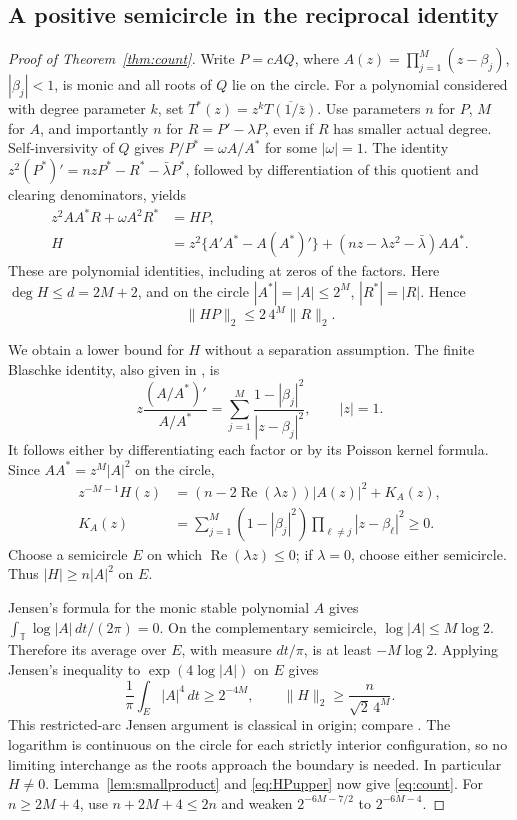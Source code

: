 \documentclass[11pt]{article}
\theoremstyle{remark}\newtheorem{remark}[theorem]{Remark}
\newcommand{\norm}[1]{\lVert #1\rVert}
\newcommand{\Rea}{\operatorname{Re}}
\begin{document}
\subsection{A positive semicircle in the reciprocal identity}
\begin{proof}[Proof of Theorem~\ref{thm:count}]
Write \(P=cAQ\), where
\(A(z)=\prod_{j=1}^M(z-\beta_j)\), \(|\beta_j|<1\), is monic
and all roots of \(Q\) lie on the circle. For a polynomial considered
with degree parameter \(k\), set
\(T^*(z)=z^k\overline{T(1/\bar z)}\).
Use parameters \(n\) for \(P\), \(M\) for \(A\), and importantly
\(n\) for \(R=P'-\lambda P\), even if \(R\) has smaller actual degree.
Self-inversivity of \(Q\) gives
\(P/P^*=\omega A/A^*\) for some \(|\omega|=1\).
The identity
\(z^2(P^*)'=nzP^*-R^*-\bar\lambda P^*\), followed by
differentiation of this quotient and clearing denominators, yields
\begin{align}
 z^2AA^*R+\omega A^2R^*&=HP,\label{eq:reciprocalH}\\
 H&=z^2\{A'A^*-A(A^*)'\}
       +(nz-\lambda z^2-\bar\lambda)AA^* .\label{eq:Hdef}
\end{align}
These are polynomial identities, including at zeros of the factors.
Here \(\deg H\le d=2M+2\), and on the circle
\(|A^*|=|A|\le2^M\), \(|R^*|=|R|\). Hence
\begin{equation}\label{eq:HPupper}
 \norm{HP}_2\le2\,4^M\norm R_2.
\end{equation}

We obtain a lower bound for \(H\) without a separation assumption.
The finite Blaschke identity, also given in
\cite[Lemma 4.3]{kovalev}, is
\[
 z\frac{(A/A^*)'}{A/A^*}
       =\sum_{j=1}^M\frac{1-|\beta_j|^2}{|z-\beta_j|^2},
       \qquad |z|=1.
\]
It follows either by differentiating each factor or by its Poisson
kernel formula. Since \(AA^*=z^M|A|^2\) on the circle,
\begin{align}
 z^{-M-1}H(z)&=(n-2\Rea(\lambda z))|A(z)|^2+K_A(z),\label{eq:positiveH}\\
 K_A(z)&=\sum_{j=1}^M(1-|\beta_j|^2)
                    \prod_{\ell\ne j}|z-\beta_\ell|^2\ge0.\nonumber
\end{align}
Choose a semicircle \(E\) on which \(\Rea(\lambda z)\le0\);
if \(\lambda=0\), choose either semicircle. Thus \(|H|\ge n|A|^2\)
on \(E\).

Jensen's formula for the monic stable polynomial \(A\) gives
\(\int_{\mathbb T}\log|A|\,dt/(2\pi)=0\).
On the complementary semicircle, \(\log|A|\le M\log2\).
Therefore its average over \(E\), with measure \(dt/\pi\), is
at least \(-M\log2\). Applying Jensen's inequality to
\(\exp(4\log|A|)\) on \(E\) gives
\[
 \frac1\pi\int_E|A|^4\,dt\ge2^{-4M},\qquad
 \norm H_2\ge\frac{n}{\sqrt2\,4^M}.
\]
This restricted-arc Jensen argument is classical in origin; compare
\cite[Lemma 4.1]{defant}. The logarithm is continuous on the circle
for each strictly interior configuration, so no limiting interchange
as the roots approach the boundary is needed.
In particular \(H\ne0\). Lemma~\ref{lem:smallproduct} and
\eqref{eq:HPupper} now give \eqref{eq:count}.
For \(n\ge2M+4\), use \(n+2M+4\le2n\) and weaken
\(2^{-6M-7/2}\) to \(2^{-6M-4}\).
\end{proof}
\end{document}
